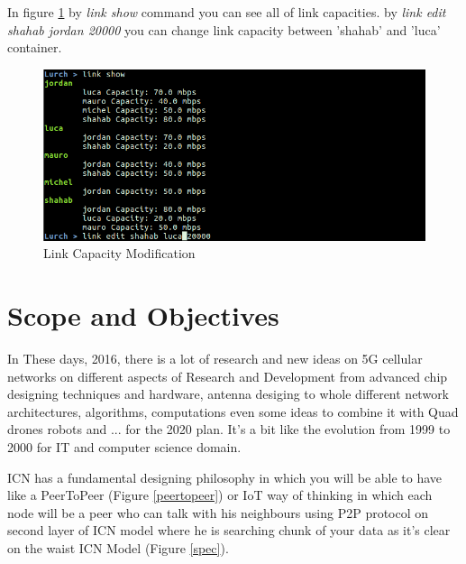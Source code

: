 In figure \ref{capacity} by \textit{link show} command you can see all of link capacities. by \textit{link edit shahab jordan 20000} you can change link capacity between 'shahab' and 'luca' container.

\begin{figure}[H]

\begin{center}

\includegraphics[scale = 0.35]{Pictures/capacity.png}

\caption{Link Capacity Modification} \label{capacity} 

\end{center}

\end{figure}
 

\section{Scope and Objectives}
In These days, 2016,  there is a lot of research and new ideas on 5G cellular networks on different aspects of Research and Development from advanced chip designing techniques and hardware, antenna desiging to whole different network architectures, algorithms, computations even some ideas to combine it with Quad drones robots and ... for the 2020 plan. It's a bit like the evolution from 1999 to 2000 for IT and computer science domain.

ICN has a fundamental designing philosophy in which you will be able to have like a PeerToPeer (Figure \ref{peertopeer}) or IoT way of thinking in which each node will be a peer who can talk with his neighbours using P2P protocol on second layer of ICN model where he is searching chunk of your data as it's clear on the waist ICN Model (Figure \ref{spec}). 


